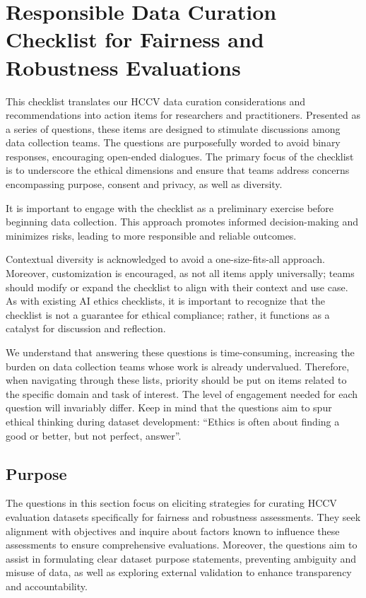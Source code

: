 \section{Responsible Data Curation Checklist for Fairness and Robustness Evaluations}
This checklist translates our HCCV data curation considerations and recommendations into
action items for researchers and practitioners. Presented as a series of questions, these
items are designed to stimulate discussions among data collection teams. The questions
are purposefully worded to avoid binary responses, encouraging open-ended dialogues. The
primary focus of the checklist is to underscore the ethical dimensions and ensure that
teams address concerns encompassing purpose, consent and privacy, as well as diversity.

It is important to engage with the checklist as a preliminary exercise before beginning
data collection. This approach promotes informed decision-making and minimizes risks,
leading to more responsible and reliable outcomes.

Contextual diversity is acknowledged to avoid a one-size-fits-all approach. Moreover,
customization is encouraged, as not all items apply universally; teams should modify or
expand the checklist to align with their context and use case. As with existing AI ethics
checklists, it is important to recognize that the checklist is not a guarantee for
ethical compliance; rather, it functions as a catalyst for discussion and reflection.

We understand that answering these questions is time-consuming, increasing the burden
on data collection teams whose work is already undervalued. Therefore, when navigating
through these lists, priority should be put on items related to the specific domain and
task of interest. The level of engagement needed for each question will invariably
differ. Keep in mind that the questions aim to spur ethical thinking during dataset
development: ``Ethics is often about finding a good or better, but not perfect,
answer''.


\subsection{Purpose}
The questions in this section focus on eliciting strategies for curating HCCV
evaluation datasets specifically for fairness and robustness assessments. They seek
alignment with objectives and inquire about factors known to influence these assessments
to ensure comprehensive evaluations. Moreover, the questions aim to assist in formulating
clear dataset purpose statements, preventing ambiguity and misuse of data, as well as
exploring external validation to enhance transparency and accountability.

